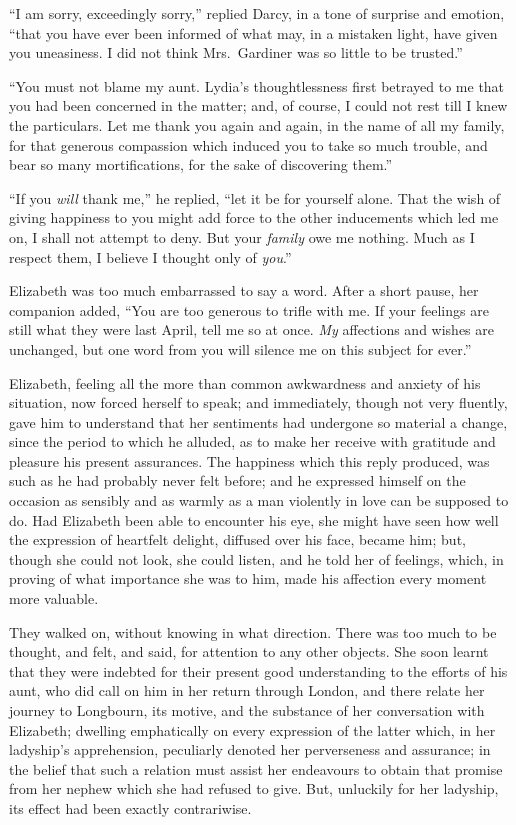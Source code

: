\documentclass[12pt,english]{book}
\begin{document}
{}``I am sorry, exceedingly sorry,'' replied Darcy, in a tone of
surprise and emotion, {}``that you have ever been informed of what
may, in a mistaken light, have given you uneasiness. I did not think
Mrs.\ Gardiner was so little to be trusted.''

{}``You must not blame my aunt. Lydia's thoughtlessness first betrayed
to me that you had been concerned in the matter; and, of course, I
could not rest till I knew the particulars. Let me thank you again
and again, in the name of all my family, for that generous compassion
which induced you to take so much trouble, and bear so many mortifications,
for the sake of discovering them.''

{}``If you \textit{will} thank me,'' he replied, {}``let it be
for yourself alone. That the wish of giving happiness to you might
add force to the other inducements which led me on, I shall not attempt
to deny. But your \textit{family} owe me nothing. Much as I respect
them, I believe I thought only of \textit{you}.''

Elizabeth was too much embarrassed to say a word. After a short pause,
her companion added, {}``You are too generous to trifle with me.
If your feelings are still what they were last April, tell me so at
once. \textit{My} affections and wishes are unchanged, but one word
from you will silence me on this subject for ever.''

Elizabeth, feeling all the more than common awkwardness and anxiety
of his situation, now forced herself to speak; and immediately, though
not very fluently, gave him to understand that her sentiments had
undergone so material a change, since the period to which he alluded,
as to make her receive with gratitude and pleasure his present assurances.
The happiness which this reply produced, was such as he had probably
never felt before; and he expressed himself on the occasion as sensibly
and as warmly as a man violently in love can be supposed to do. Had
Elizabeth been able to encounter his eye, she might have seen how
well the expression of heartfelt delight, diffused over his face,
became him; but, though she could not look, she could listen, and
he told her of feelings, which, in proving of what importance she
was to him, made his affection every moment more valuable.

They walked on, without knowing in what direction. There was too much
to be thought, and felt, and said, for attention to any other objects.
She soon learnt that they were indebted for their present good understanding
to the efforts of his aunt, who did call on him in her return through
London, and there relate her journey to Longbourn, its motive, and
the substance of her conversation with Elizabeth; dwelling emphatically
on every expression of the latter which, in her ladyship's apprehension,
peculiarly denoted her perverseness and assurance; in the belief that
such a relation must assist her endeavours to obtain that promise
from her nephew which she had refused to give. But, unluckily for
her ladyship, its effect had been exactly contrariwise.
\end{document}
